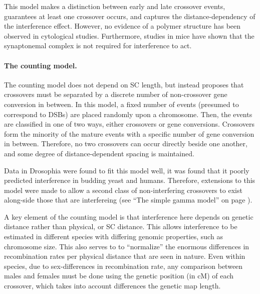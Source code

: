 This model makes a distinction between early and late crossover events, guarantees at least one crossover occurs, and captures the distance-dependency of the interference effect.
However, no evidence of a polymer structure has been observed in cytological studies.
Furthermore, studies in mice have shown that the synaptonemal complex is not required for interference to act\cite{DeBoer2007}.


\paragraph{The counting model.}
The counting model does not depend on SC length, but instead proposes that crossovers must be separated by a discrete number of non-crossover gene conversion in between\cite{Foss1993,Foss1995}.
In this model, a fixed number of events (presumed to correspond to DSBs) are placed randomly upon a chromosome.
Then, the events are classified in one of two ways, either crossovers or gene conversions.
Crossovers form the minority of the mature events with a specific number of gene conversion in between.
Therefore, no two crossovers can occur directly beside one another, and some degree of distance-dependent spacing is maintained.

Data in Drosophia were found to fit this model well, it was found that it poorly predicted interference in budding yeast and humans\cite{Foss1995}.
Therefore, extensions to this model were made to allow a second class of non-interfering crossovers to exist along-side those that are interfereing (see ``The simple gamma model'' on page \pageref{cointTPM}).

A key element of the counting model is that interference here depends on genetic distance rather than physical, or SC distance.
This allows interference to be estimated in different species with differing genomic properties, such as chromosome size.
This also serves to to ``normalize'' the enormous differences in recombination rates per physical distance that are seen in nature.
Even within species, due to sex-differences in recombination rate, any comparison between males and females must be done using the genetic position (in cM) of each crossover, which takes into account differences the genetic map length.

